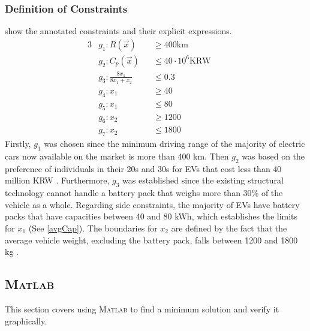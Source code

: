 \documentclass[11pt,twocolumn]{article}
\begin{document}
            \subsubsection{Definition of Constraints}
                 show the annotated constraints and their explicit expressions.
                \begin{alignat}{3}
                    &g_1: R(\vec{x})&&\geq 400\mathrm{km} && \label{eqbegin} \\
                    &g_2: C_{p} (\vec{x})&&\leq 40\cdot 10^6\text{KRW} &&\\
                    &g_3: \frac{8x_1}{8x_1 +x_2}&&\leq 0.3 &&\\
                    &g_4: x_1 &&\geq 40 &&\\
                    &g_5: x_1 &&\leq 80 &&\\
                    &g_6: x_2 &&\geq 1200 &&\\
                    &g_7: x_2 &&\leq 1800 && \label{eqend}
                \end{alignat}
                Firstly, $g_1$ was chosen since the minimum driving range of the majority of electric cars now available on the market is more than 400 km.
                Then $g_2$ was based on the preference of individuals in their 20s and 30s for EVs that cost less than 40 million KRW \cite{segye24}.
                Furthermore, $g_3$ was established since the existing structural technology cannot handle a battery pack that weighs more than 30\% of the vehicle as a whole.
                Regarding side constraints, the majority of EVs have battery packs that have capacities between 40 and 80 kWh\cite{4080capacity}, which establishes the limits for $x_1$ (See \cref{avgCap}).
                The boundaries for $x_2$ are defined by the fact that the average vehicle weight, excluding the battery pack, falls between 1200 and 1800 kg \cite{glider12}.
    \subsection{\textsc{Matlab}}
            This section covers using \textsc{Matlab} to find a minimum solution and verify it graphically.
\end{document}
